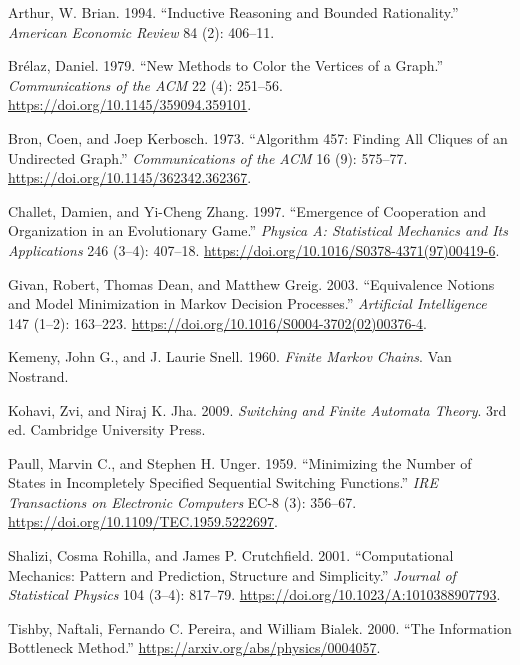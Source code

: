 \documentclass[
  11pt,
]{article}
\newlength{\cslhangindent}
\newlength{\cslentryspacingunit} %
\newenvironment{CSLReferences}[2] %
 {%
  \setlength{\parindent}{0pt}
  \ifodd #1
  \let\oldpar\par
  \def\par{\hangindent=\cslhangindent\oldpar}
  \fi
  \setlength{\parskip}{#2\cslentryspacingunit}
 }%
 {}
\begin{document}
\hypertarget{refs}{}
\begin{CSLReferences}{1}{0}
\leavevmode{}%
Arthur, W. Brian. 1994. {``Inductive Reasoning and Bounded
Rationality.''} \emph{American Economic Review} 84 (2): 406--11.

\leavevmode{}%
Brélaz, Daniel. 1979. {``New Methods to Color the Vertices of a
Graph.''} \emph{Communications of the ACM} 22 (4): 251--56.
\url{https://doi.org/10.1145/359094.359101}.

\leavevmode{}%
Bron, Coen, and Joep Kerbosch. 1973. {``Algorithm 457: Finding All
Cliques of an Undirected Graph.''} \emph{Communications of the ACM} 16
(9): 575--77. \url{https://doi.org/10.1145/362342.362367}.

\leavevmode{}%
Challet, Damien, and Yi-Cheng Zhang. 1997. {``Emergence of Cooperation
and Organization in an Evolutionary Game.''} \emph{Physica A:
Statistical Mechanics and Its Applications} 246 (3--4): 407--18.
\url{https://doi.org/10.1016/S0378-4371(97)00419-6}.

\leavevmode{}%
Givan, Robert, Thomas Dean, and Matthew Greig. 2003. {``Equivalence
Notions and Model Minimization in {M}arkov Decision Processes.''}
\emph{Artificial Intelligence} 147 (1--2): 163--223.
\url{https://doi.org/10.1016/S0004-3702(02)00376-4}.

\leavevmode{}%
Kemeny, John G., and J. Laurie Snell. 1960. \emph{Finite Markov Chains}.
Van Nostrand.

\leavevmode{}%
Kohavi, Zvi, and Niraj K. Jha. 2009. \emph{Switching and Finite Automata
Theory}. 3rd ed. Cambridge University Press.

\leavevmode{}%
Paull, Marvin C., and Stephen H. Unger. 1959. {``Minimizing the Number
of States in Incompletely Specified Sequential Switching Functions.''}
\emph{IRE Transactions on Electronic Computers} EC-8 (3): 356--67.
\url{https://doi.org/10.1109/TEC.1959.5222697}.

\leavevmode{}%
Shalizi, Cosma Rohilla, and James P. Crutchfield. 2001. {``Computational
Mechanics: Pattern and Prediction, Structure and Simplicity.''}
\emph{Journal of Statistical Physics} 104 (3--4): 817--79.
\url{https://doi.org/10.1023/A:1010388907793}.

\leavevmode{}%
Tishby, Naftali, Fernando C. Pereira, and William Bialek. 2000. {``The
Information Bottleneck Method.''}
\url{https://arxiv.org/abs/physics/0004057}.

\end{CSLReferences}
\end{document}
